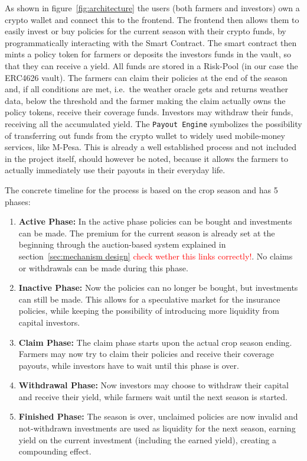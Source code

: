 \documentclass[11pt,a4paper]{article}
\begin{document}
		As shown in figure~\ref{fig:architecture} the users (both farmers and investors) own a crypto wallet and connect this to the frontend.
		The frontend then allows them to easily invest or buy policies for the current season with their crypto funds, by programmatically interacting with the Smart Contract.
		The smart contract then mints a policy token for farmers or deposits the investors funds in the vault, so that they can receive a yield.
		All funds are stored in a Risk-Pool (in our case the ERC4626 vault).
		The farmers can claim their policies at the end of the season and, if all conditions are met, i.e.\ the weather oracle gets and returns weather data, below the threshold and the farmer making the claim actually owns the policy tokens, receive their coverage funds.
		Investors may withdraw their funds, receiving all the accumulated yield.
		The \texttt{Payout Engine} symbolizes the possibility of transferring out funds from the crypto wallet to widely used mobile-money services, like M-Pesa.
		This is already a well established process and not included in the project itself, should however be noted, because it allows the farmers to actually immediately use their payouts in their everyday life.

		The concrete timeline for the process is based on the crop season and has 5 phases:
		\begin{enumerate}
			\item \textbf{Active Phase:} In the active phase policies can be bought and investments can be made.
				The premium for the current season is already set at the beginning through the auction-based system explained in section~\ref{sec:mechanism design} \textcolor{red}{check wether this links correctly!}.
				No claims or withdrawals can be made during this phase.
			\item \textbf{Inactive Phase:} Now the policies can no longer be bought, but investments can still be made.
				This allows for a speculative market for the insurance policies, while keeping the possibility of introducing more liquidity from capital investors.
			\item \textbf{Claim Phase:} The claim phase starts upon the actual crop season ending.
				Farmers may now try to claim their policies and receive their coverage payouts, while investors have to wait until this phase is over.
			\item \textbf{Withdrawal Phase:} Now investors may choose to withdraw their capital and receive their yield, while farmers wait until the next season is started.
			\item \textbf{Finished Phase:} The season is over, unclaimed policies are now invalid and not-withdrawn investments are used as liquidity for the next season, earning yield on the current investment (including the earned yield), creating a compounding effect.
				\label{enum:phases}
		\end{enumerate}
\end{document}
